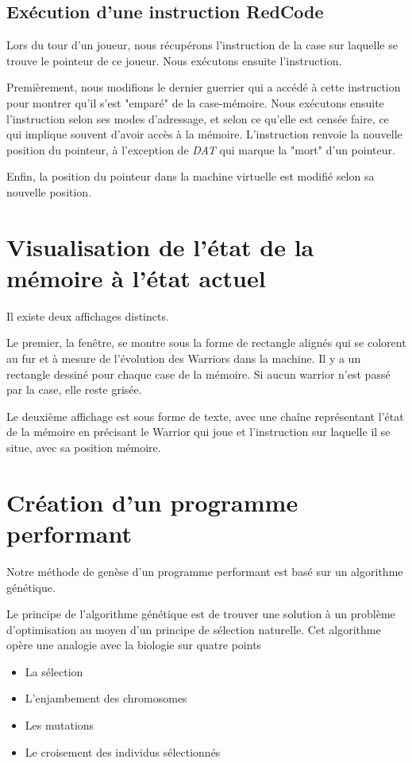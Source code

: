 \documentclass[hidelinks]{report}
\begin{document}
\subsection{Exécution d'une instruction RedCode}
Lors du tour d'un joueur, nous récupérons l'instruction de la case sur laquelle se trouve le pointeur de ce joueur. Nous exécutons ensuite l'instruction. 

Premièrement, nous modifions le dernier guerrier qui a accédé à cette instruction pour montrer qu'il s'est "emparé" de la case-mémoire. Nous exécutons ensuite l'instruction selon ses modes d'adressage, et selon ce qu'elle est censée faire, ce qui implique souvent d'avoir accès à la mémoire. L'instruction renvoie la nouvelle position du pointeur, à l'exception de \emph{DAT} qui marque la "mort" d'un pointeur.

Enfin, la position du pointeur dans la machine virtuelle est modifié selon sa nouvelle position.

\section{Visualisation de l'état de la mémoire à l'état actuel}
Il existe deux affichages distincts.

Le premier, la fenêtre, se montre sous la forme de rectangle alignés qui se colorent au fur et à mesure de l'évolution des Warriors dans la machine. Il y a un rectangle dessiné pour chaque case de la mémoire. Si aucun warrior n'est passé par la case, elle reste grisée.

Le deuxième affichage est sous forme de texte, avec une chaîne représentant l'état de la mémoire en précisant le Warrior qui joue et l'instruction sur laquelle il se situe, avec sa position mémoire.

\section{Création d'un programme performant\label{sec:pperf}}
Notre méthode de genèse d'un programme performant est basé sur un algorithme génétique.

Le principe de l'algorithme génétique est de trouver une solution à un problème d'optimisation au moyen d'un principe de sélection naturelle. Cet algorithme opère une analogie avec la biologie sur quatre points
\begin{itemize}
    \item La sélection
    \item L'enjambement des chromosomes
    \item Les mutations
    \item Le croisement des individus sélectionnés
\end{itemize}
\end{document}
